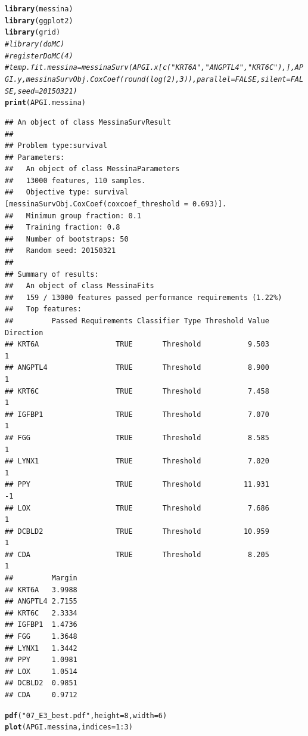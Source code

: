 \documentclass{article}\usepackage[]{graphicx}\usepackage[]{color}
\makeatletter
\newcommand{\hlnum}[1]{\textcolor[rgb]{0.686,0.059,0.569}{#1}}%
\newcommand{\hlstr}[1]{\textcolor[rgb]{0.192,0.494,0.8}{#1}}%
\newcommand{\hlcom}[1]{\textcolor[rgb]{0.678,0.584,0.686}{\textit{#1}}}%
\newcommand{\hlopt}[1]{\textcolor[rgb]{0,0,0}{#1}}%
\newcommand{\hlstd}[1]{\textcolor[rgb]{0.345,0.345,0.345}{#1}}%
\newcommand{\hlkwc}[1]{\textcolor[rgb]{0.333,0.667,0.333}{#1}}%
\newcommand{\hlkwd}[1]{\textcolor[rgb]{0.737,0.353,0.396}{\textbf{#1}}}%
\newenvironment{kframe}{%
 \def\at@end@of@kframe{}%
 \ifinner\ifhmode%
  \def\at@end@of@kframe{\end{minipage}}%
  \begin{minipage}{\columnwidth}%
 \fi\fi%
 \def\FrameCommand##1{\hskip\@totalleftmargin \hskip-\fboxsep
 \colorbox{shadecolor}{##1}\hskip-\fboxsep
     \hskip-\linewidth \hskip-\@totalleftmargin \hskip\columnwidth}%
 \MakeFramed {\advance\hsize-\width
   \@totalleftmargin\z@ \linewidth\hsize
   \@setminipage}}%
 {\par\unskip\endMakeFramed%
 \at@end@of@kframe}
\newenvironment{knitrout}{}{} %
\makeatother
\begin{document}
\begin{knitrout}
\color{fgcolor}\begin{kframe}
\begin{alltt}
\hlkwd{library}\hlstd{(messina)}
\hlkwd{library}\hlstd{(ggplot2)}
\hlkwd{library}\hlstd{(grid)}
\hlcom{# library(doMC)}
\hlcom{# registerDoMC(4)}
\hlcom{# temp.fit.messina = messinaSurv(APGI.x[c("KRT6A", "ANGPTL4", "KRT6C"),], APGI.y, messinaSurvObj.CoxCoef(round(log(2), 3)), parallel = FALSE, silent = FALSE, seed = 20150321)}
\hlkwd{print}\hlstd{(APGI.messina)}
\end{alltt}
\begin{verbatim}
## An object of class MessinaSurvResult
## 
## Problem type:survival
## Parameters:
##   An object of class MessinaParameters
##   13000 features, 110 samples.
##   Objective type: survival [messinaSurvObj.CoxCoef(coxcoef_threshold = 0.693)].
##   Minimum group fraction: 0.1
##   Training fraction: 0.8
##   Number of bootstraps: 50
##   Random seed: 20150321
## 
## Summary of results:
##   An object of class MessinaFits
##   159 / 13000 features passed performance requirements (1.22%)
##   Top features:
##         Passed Requirements Classifier Type Threshold Value Direction
## KRT6A                  TRUE       Threshold           9.503         1
## ANGPTL4                TRUE       Threshold           8.900         1
## KRT6C                  TRUE       Threshold           7.458         1
## IGFBP1                 TRUE       Threshold           7.070         1
## FGG                    TRUE       Threshold           8.585         1
## LYNX1                  TRUE       Threshold           7.020         1
## PPY                    TRUE       Threshold          11.931        -1
## LOX                    TRUE       Threshold           7.686         1
## DCBLD2                 TRUE       Threshold          10.959         1
## CDA                    TRUE       Threshold           8.205         1
##         Margin
## KRT6A   3.9988
## ANGPTL4 2.7155
## KRT6C   2.3334
## IGFBP1  1.4736
## FGG     1.3648
## LYNX1   1.3442
## PPY     1.0981
## LOX     1.0514
## DCBLD2  0.9851
## CDA     0.9712
\end{verbatim}
\begin{alltt}
\hlkwd{pdf}\hlstd{(}\hlstr{"07_E3_best.pdf"}\hlstd{,} \hlkwc{height} \hlstd{=} \hlnum{8}\hlstd{,} \hlkwc{width} \hlstd{=} \hlnum{6}\hlstd{)}
\hlkwd{plot}\hlstd{(APGI.messina,} \hlkwc{indices} \hlstd{=} \hlnum{1}\hlopt{:}\hlnum{3}\hlstd{)}
\end{alltt}



\end{kframe}
\end{knitrout}
\end{document}
